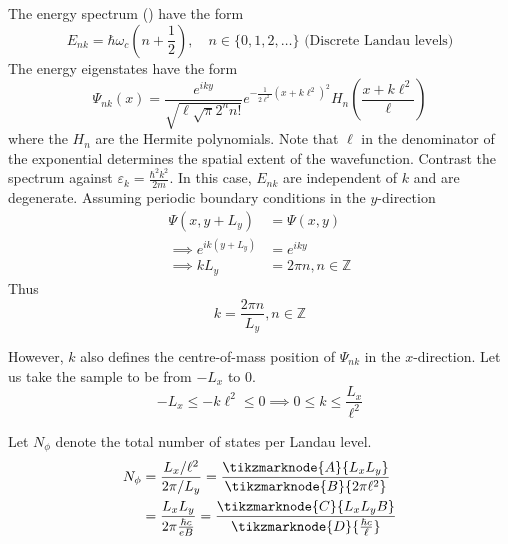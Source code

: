 \documentclass[12pt,a4paper,titlepage]{article}
\newcommand{\trm}[1]{\textrm{#1}} %
\newcommand{\ul}[1]{\underline{\smash{#1}}} %
\begin{document}
The energy spectrum (\ul{Landau levels}) have the form
\begin{equation}
E_{nk}=\hbar\omega_{c}\left(n+\frac{1}{2}\right),\quad n\in\{0,1,2,\ldots\} \trm{ (Discrete Landau levels)}	
\end{equation}
The energy eigenstates have the form
\begin{equation}
\Psi_{nk}(x)=\frac{e^{iky}}{\sqrt{\ell\sqrt{\pi}2^{n}n!}}e^{-\frac{1}{2\ell^{2}}(x+k\ell^{2})^{2}}H_{n}\left(\frac{x+k\ell^{2}}{\ell}\right)
\end{equation}
where the $H_{n}$ are the Hermite polynomials. Note that $\ell$ in the denominator of the exponential determines the spatial extent of the wavefunction. Contrast the spectrum against $\varepsilon_{k}=\frac{\hbar^{2}k^{2}}{2m}$. In this case, $E_{nk}$ are independent of $k$ and are degenerate. Assuming periodic boundary conditions in the $y$-direction
\begin{equation}
\begin{aligned}
\Psi(x,y+L_{y})&=\Psi(x,y)\\
\implies e^{ik(y+L_{y})}&=e^{iky}\\
\implies kL_{y}&=2\pi n, n\in\mathbb{Z}
\end{aligned}
\end{equation}
Thus
\begin{equation}
k=\frac{2\pi n}{L_{y}}, n\in\mathbb{Z}
\end{equation}

However, $k$ also defines the centre-of-mass position of $\Psi_{nk}$ in the $x$-direction. Let us take the sample to be from $-L_{x}$ to 0.
\begin{equation}
-L_{x}\leq -k\ell^{2}\leq 0 \implies 0\leq k \leq \frac{L_{x}}{\ell^{2}}
\end{equation}

Let $N_{\phi}$ denote the total number of states per Landau level.
\begin{equation}
\begin{aligned}
N_{\phi}&=\frac{L_{x}/\ell^{2}}{2\pi/L_{y}}=\frac{\tikzmarknode{A}{L_{x}L_{y}}}{\tikzmarknode{B}{2\pi\ell^{2}}}\\
&=\frac{L_{x}L_{y}}{2\pi\frac{\hbar c}{eB}}=\frac{\tikzmarknode{C}{L_{x}L_{y}B}}{\tikzmarknode{D}{\frac{\hbar c}{\ell}}}
\end{aligned}
\end{equation}

\end{document}
